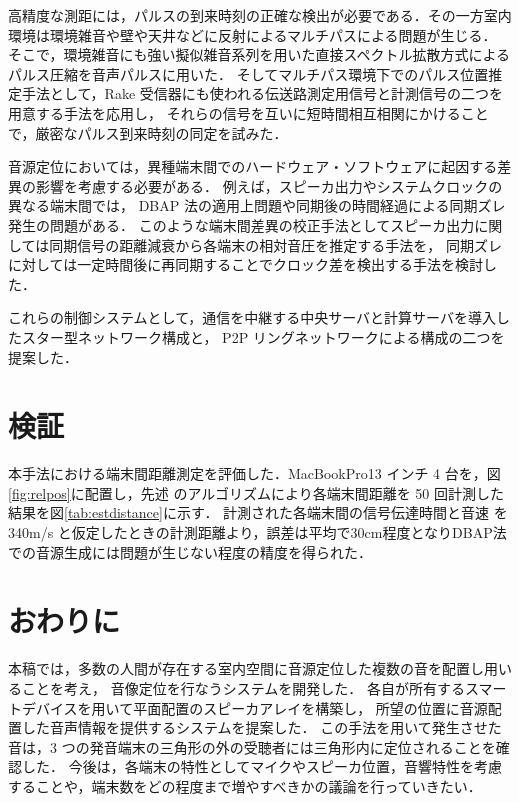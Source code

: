 \documentclass[11pt]{jarticle}
\begin{document}
高精度な測距には，パルスの到来時刻の正確な検出が必要である．その一方室内環境は環境雑音や壁や天井などに反射によるマルチパスによる問題が生じる．
そこで，環境雑音にも強い擬似雑音系列を用いた直接スペクトル拡散方式によるパルス圧縮を音声パルスに用いた．
そしてマルチパス環境下でのパルス位置推定手法として，Rake 受信器にも使われる伝送路測定用信号と計測信号の二つを用意する手法を応用し，
それらの信号を互いに短時間相互相関にかけることで，厳密なパルス到来時刻の同定を試みた．


音源定位においては，異種端末間でのハードウェア・ソフトウェアに起因する差異の影響を考慮する必要がある．
例えば，スピーカ出力やシステムクロックの異なる端末間では， DBAP 法の適用上問題や同期後の時間経過による同期ズレ発生の問題がある．
このような端末間差異の校正手法としてスピーカ出力に関しては同期信号の距離減衰から各端末の相対音圧を推定する手法を，
同期ズレに対しては一定時間後に再同期することでクロック差を検出する手法を検討した．


これらの制御システムとして，通信を中継する中央サーバと計算サーバを導入したスター型ネットワーク構成と， P2P リングネットワークによる構成の二つを提案した．


\section{検証}
本手法における端末間距離測定を評価した．MacBookPro13 インチ 4 台を，図\ref{fig:relpos}に配置し，先述 のアルゴリズムにより各端末間距離を 50 回計測した結果を図\ref{tab:estdistance}に示す．
計測された各端末間の信号伝達時間と音速 を 340m/s と仮定したときの計測距離より，誤差は平均で30cm程度となりDBAP法での音源生成には問題が生じない程度の精度を得られた．

\section{おわりに}
本稿では，多数の人間が存在する室内空間に音源定位した複数の音を配置し用いることを考え，
音像定位を行なうシステムを開発した．
各自が所有するスマートデバイスを用いて平面配置のスピーカアレイを構築し，
所望の位置に音源配置した音声情報を提供するシステムを提案した．
この手法を用いて発生させた音は，3 つの発音端末の三角形の外の受聴者には三角形内に定位されることを確認した．
今後は，各端末の特性としてマイクやスピーカ位置，音響特性を考慮することや，端末数をどの程度まで増やすべきかの議論を行っていきたい．
\end{document}
